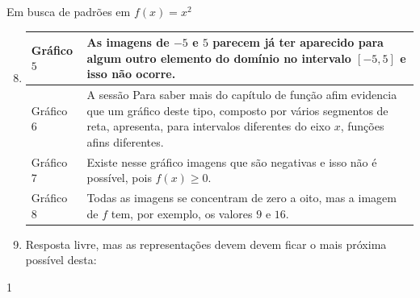 \clearmargin
\begin{answer}{Em busca de padrões em \(f(x)=x^2\)}
{
\begin{enumerate}\setcounter{enumi}{7}
\item {}
{
\resizebox{.9\linewidth}{!}
{
\begin{tabular}{|e{.15\linewidth}|e{.8\linewidth}|}
\hline
Gráfico \(5\) & As imagens de \(-5\) e \(5\) parecem já ter aparecido para algum outro elemento do domínio no intervalo \([-5,5]\) e isso não ocorre. \tabularnewline
\hline
Gráfico \(6\) & A sessão Para saber mais do capítulo de função afim evidencia que um gráfico deste tipo, composto por vários segmentos de reta, apresenta, para intervalos diferentes do eixo \(x\), funções afins diferentes. \tabularnewline
\hline
Gráfico \(7\) & Existe nesse gráfico imagens que são negativas e isso não é possível, pois \(f(x) \geq 0\). \tabularnewline
\hline
Gráfico \(8\) & Todas as imagens se concentram de zero a oito, mas a imagem de \(f\) tem, por exemplo, os valores \(9\) e \(16\). \tabularnewline
\hline
\end{tabular}

}}

\item Resposta livre, mas as representações devem devem ficar o mais próxima possível desta:
\end{enumerate}
}{1}
\end{answer}

